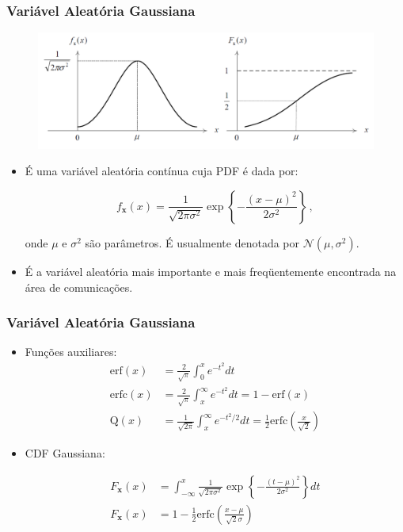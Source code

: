 \begin{frame}
    \frametitle{Variável Aleatória Gaussiana}

    \begin{figure}[t]
	  \begin{center}
	    \includegraphics[width=0.77\columnwidth]{figs/fig13}
	  \end{center}
	\end{figure}

    \begin{itemize}
     \item É uma variável aleatória contínua cuja PDF é dada por:

      \begin{equation}
	  f_{\mathbf{x}}(x) = \frac{1}{\sqrt{2\pi\sigma^2}} \exp \left\{-\frac{(x-\mu)^2}{2\sigma^2}\right\} \, ,
      \end{equation}

      onde $\mu$ e $\sigma^2$ são parâmetros. É usualmente denotada por $\mathcal{N}(\mu,\sigma^2)$.
      \item É a variável aleatória mais importante e mais freqüentemente encontrada na área de comunicações.
    \end{itemize}
   
\end{frame}

\begin{frame}
    \frametitle{Variável Aleatória Gaussiana}

    \begin{itemize}
     \item Funções auxiliares:
      \begin{align}
	   \mathrm{erf}(x) &= \frac{2}{\sqrt{\pi}} \int_0^x e^{-t^2} dt \\
	   \mathrm{erfc}(x) &= \frac{2}{\sqrt{\pi}} \int_x^{\infty} e^{-t^2} dt  = 1 - \mathrm{erf}(x) \\
	   \mathrm{Q}(x) &= \frac{1}{\sqrt{2\pi}} \int_x^{\infty} e^{-t^2/2} dt  = \frac{1}{2}\mathrm{erfc}\left(\frac{x}{\sqrt{2}}\right)
      \end{align}

     \item CDF Gaussiana:

      \begin{align}
	  F_{\mathbf{x}}(x) &= \int_{-\infty}^x \frac{1}{\sqrt{2\pi\sigma^2}} \exp \left\{-\frac{(t-\mu)^2}{2\sigma^2}\right\} dt \\
	  F_{\mathbf{x}}(x) &= 1 - \frac{1}{2}\mathrm{erfc}\left( \frac{x - \mu}{\sqrt{2}\sigma} \right)
      \end{align}

    \end{itemize}

\end{frame}

